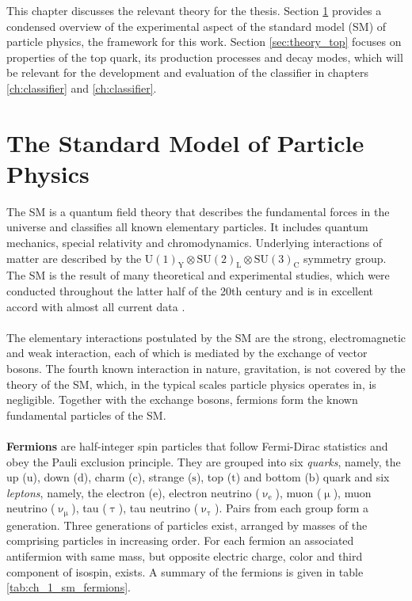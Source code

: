 This chapter discusses the relevant theory for the thesis. Section \ref{sec:theory_sm} provides a condensed overview of the experimental aspect of the standard model (SM) of particle physics, the framework for this work. Section \ref{sec:theory_top} focuses on properties of the top quark, its production processes and decay modes, which will be relevant for the development and evaluation of the classifier in chapters \ref{ch:classifier} and \ref{ch:classifier}.
\section{The Standard Model of Particle Physics}
\label{sec:theory_sm}
The SM is a quantum field theory that describes the fundamental forces in the universe and classifies all known elementary particles. It includes quantum mechanics, special relativity and chromodynamics. Underlying interactions of matter are described by the $\textrm{U}(1)_\textrm{Y}\otimes \textrm{SU}(2)_\textrm{L}\otimes \textrm{SU}(3)_\textrm{C}$ symmetry group. The SM is the result of many theoretical and experimental studies, which were conducted throughout the latter half of the 20th century and is in excellent accord with almost all current data \cite{RevModPhys.71.S96}.\\ \\
The elementary interactions postulated by the SM are the strong, electromagnetic and weak interaction, each of which is mediated by the exchange of vector bosons. The fourth known interaction in nature, gravitation, is not covered by the theory of the SM, which, in the typical scales particle physics operates in, is negligible. Together with the exchange bosons, fermions form the known fundamental particles of the SM.\\ \\
\textbf{Fermions} are half-integer spin particles that follow Fermi-Dirac statistics and obey the Pauli exclusion principle. They are grouped into six \emph{quarks}, namely, the up ($\textrm{u}$), down ($\textrm{d}$), charm ($\textrm{c}$), strange ($\textrm{s}$), top ($\textrm{t}$) and bottom ($\textrm{b}$) quark and six \emph{leptons}, namely, the electron ($\textrm{e}$), electron neutrino ($\upnu_\textrm{e}$), muon ($\upmu$), muon neutrino ($\upnu_\upmu$), tau ($\uptau$), tau neutrino ($\upnu_\uptau$). Pairs from each group form a generation. Three generations of particles exist, arranged by masses of the comprising particles in increasing order. For each fermion an associated antifermion with same mass, but opposite electric charge, color and third component of isospin, exists. A summary of the fermions is given in table \ref{tab:ch_1_sm_fermions}.


